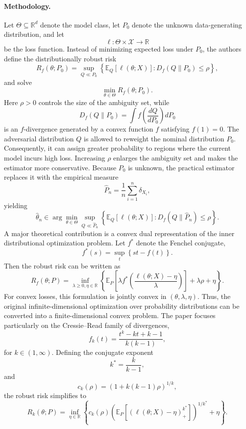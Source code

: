\documentclass[11pt]{article}
\begin{document}
\paragraph{Methodology.}
Let \(\Theta \subseteq \mathbb{R}^d\) denote the model class, let \(P_0\) denote the unknown data-generating distribution, and let
\[
\ell:\Theta\times\mathcal{X}\rightarrow\mathbb{R}
\]
be the loss function. Instead of minimizing expected loss under \(P_0\), the authors define the distributionally robust risk
\[
R_f(\theta;P_0)
=
\sup_{Q \ll P_0}
\left\{
\mathbb{E}_{Q}
\left[
\ell(\theta;X)
\right]
:
D_f(Q\|P_0)\leq \rho
\right\},
\]
and solve
\[
\min_{\theta\in\Theta}
R_f(\theta;P_0).
\]
Here \(\rho>0\) controls the size of the ambiguity set, while
\[
D_f(Q\|P_0)
=
\int
f\left(
\frac{dQ}{dP_0}
\right)
dP_0
\]
is an \(f\)-divergence generated by a convex function \(f\) satisfying \(f(1)=0\).
The adversarial distribution \(Q\) is allowed to reweight the nominal distribution \(P_0\). Consequently, it can assign greater probability to regions where the current model incurs high loss. Increasing \(\rho\) enlarges the ambiguity set and makes the estimator more conservative.
Because \(P_0\) is unknown, the practical estimator replaces it with the empirical measure
\[
\widehat{P}_n
=
\frac{1}{n}
\sum_{i=1}^{n}
\delta_{X_i},
\]
yielding
\[
\widehat{\theta}_n
\in
\arg\min_{\theta\in\Theta}
\sup_{Q\ll\widehat{P}_n}
\left\{
\mathbb{E}_{Q}
\left[
\ell(\theta;X)
\right]
:
D_f(Q\|\widehat{P}_n)\leq\rho
\right\}.
\]
A major theoretical contribution is a convex dual representation of the inner distributional optimization problem. Let \(f^*\) denote the Fenchel conjugate,
\[
f^*(s)
=
\sup_t
\left\{
st-f(t)
\right\}.
\]
Then the robust risk can be written as
\[
R_f(\theta;P)
=
\inf_{\lambda\geq 0,\eta\in\mathbb{R}}
\left\{
\mathbb{E}_{P}
\left[
\lambda
f^*
\left(
\frac{\ell(\theta;X)-\eta}{\lambda}
\right)
\right]
+
\lambda\rho
+
\eta
\right\}.
\]
For convex losses, this formulation is jointly convex in \((\theta,\lambda,\eta)\). Thus, the original infinite-dimensional optimization over probability distributions can be converted into a finite-dimensional convex problem.
The paper focuses particularly on the Cressie--Read family of divergences,
\[
f_k(t)
=
\frac{
t^k-kt+k-1
}{
k(k-1)
},
\]
for \(k\in(1,\infty)\). Defining the conjugate exponent
\[
k^*
=
\frac{k}{k-1},
\]
and
\[
c_k(\rho)
=
\left(
1+k(k-1)\rho
\right)^{1/k},
\]
the robust risk simplifies to
\[
R_k(\theta;P)
=
\inf_{\eta\in\mathbb{R}}
\left\{
c_k(\rho)
\left(
\mathbb{E}_{P}
\left[
\left(
\ell(\theta;X)-\eta
\right)_+^{k^*}
\right]
\right)^{1/k^*}
+
\eta
\right\}.
\]
\end{document}
